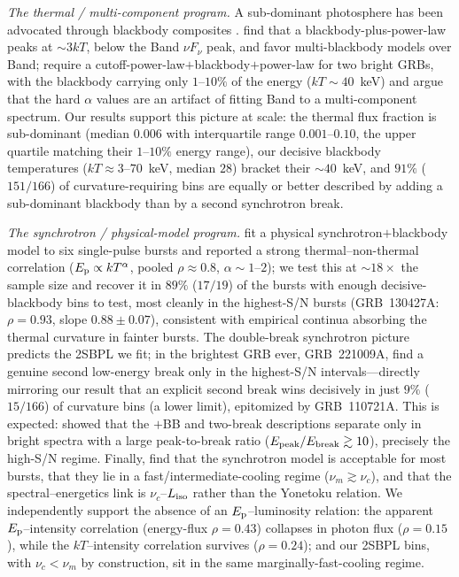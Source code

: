 \documentclass[twocolumn]{aastex631}
\newcommand{\nuc}{\ensuremath{\nu_c}}
\newcommand{\num}{\ensuremath{\nu_m}}
\newcommand{\Ep}{\ensuremath{E_{\rm p}}}
\newcommand{\kT}{\ensuremath{kT}}
\newcommand{\Liso}{\ensuremath{L_{\rm iso}}}
\begin{document}
\emph{The thermal / multi-component program.}
A sub-dominant photosphere has been advocated through blackbody composites
\citep{Ryde2004,Guiriec2010,Guiriec2011,Guiriec2015,Basak2014}. \citet{Basak2014}
find that a blackbody-plus-power-law peaks at $\sim3kT$, below the Band $\nu
F_\nu$ peak, and favor multi-blackbody models over Band; \citet{Guiriec2015}
require a cutoff-power-law$+$blackbody$+$power-law for two bright GRBs, with the
blackbody carrying only $1$--$10\%$ of the energy ($kT\sim40$~keV) and argue that
the hard $\alpha$ values are an artifact of fitting Band to a multi-component
spectrum. Our results support this picture at scale: the thermal flux fraction
is sub-dominant (median $0.006$ with interquartile range $0.001$--$0.10$, the
upper quartile matching their $1$--$10\%$ energy range), our decisive blackbody
temperatures ($\kT\approx3$--$70$~keV, median $28$) bracket their
$\sim$$40$~keV, and $91\%$ ($151/166$) of curvature-requiring bins are equally
or better described by adding a sub-dominant blackbody than by a second
synchrotron break.

\emph{The synchrotron / physical-model program.}
\citet{Burgess2014a} fit a physical synchrotron$+$blackbody model to six
single-pulse bursts and reported a strong thermal--non-thermal correlation
($\Ep\propto\kT^{\alpha}$, pooled $\rho\approx0.8$, $\alpha\sim1$--$2$); we test
this at $\sim$$18\times$ the sample size and recover it in $89\%$ ($17/19$) of
the bursts with enough decisive-blackbody bins to test, most cleanly in the
highest-S/N bursts (GRB~130427A: $\rho=0.93$, slope $0.88\pm0.07$), consistent
with empirical continua absorbing the thermal curvature in fainter bursts. The
double-break synchrotron picture \citep{Oganesyan2017,Ravasio2018,Ravasio2019}
predicts the 2SBPL we fit; in the brightest GRB ever, GRB~221009A,
\citet{Ravasio2023} find a genuine second low-energy break only in the
highest-S/N intervals---directly mirroring our result that an explicit second
break wins decisively in just $9\%$ ($15/166$) of curvature bins (a lower
limit), epitomized by GRB~110721A. This is expected: \citet{Ravasio2018} showed
that the $+$BB and two-break descriptions separate only in bright spectra with
a large peak-to-break ratio ($E_{\rm peak}/E_{\rm break}\gtrsim10$), precisely
the high-S/N regime. Finally, \citet{Mei2025} find that the
synchrotron model is acceptable for most bursts, that they lie in a
fast/intermediate-cooling regime ($\num\gtrsim\nuc$), and that the
spectral--energetics link is $\nuc$--$\Liso$ rather than the Yonetoku relation. We
independently support the absence of an $\Ep$--luminosity relation: the apparent
$\Ep$--intensity correlation (energy-flux $\rho=0.43$) collapses in photon flux
($\rho=0.15$), while the $\kT$--intensity correlation survives ($\rho=0.24$); and
our 2SBPL bins, with $\nuc<\num$ by construction, sit in the same
marginally-fast-cooling regime.
\end{document}
